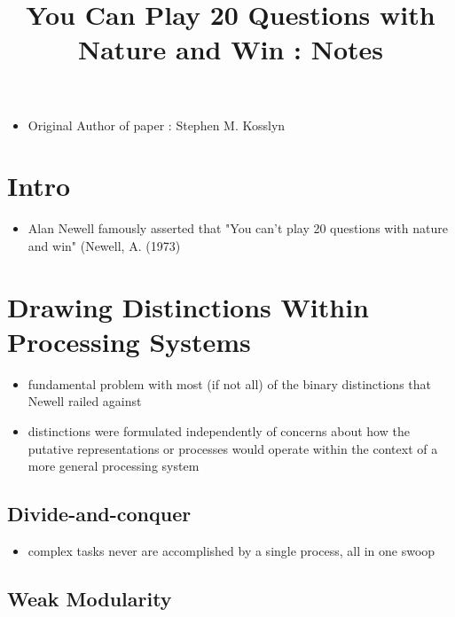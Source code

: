 \documentclass[12pt]{article}
\author{}
\begin{document}
\title{You Can Play 20 Questions with Nature and Win : Notes}
\maketitle{}

\begin{itemize}

\item Original Author of paper : Stephen M. Kosslyn
\end{itemize}

\section{Intro}

\begin{itemize}

\item Alan Newell famously asserted that "You can't play 20 questions with nature and win" (Newell, A. (1973)
\end{itemize}

\section{Drawing Distinctions Within Processing Systems}

\begin{itemize}

\item fundamental problem with most (if not all) of the binary distinctions that Newell railed against
\item distinctions were formulated independently of concerns about how the putative representations or processes would operate within the context of a more general processing system
\end{itemize}

\subsection{Divide-and-conquer}

\begin{itemize}

\item complex tasks never are accomplished by a single process, all in one swoop
\end{itemize}

\subsection{Weak Modularity}
\end{document}
